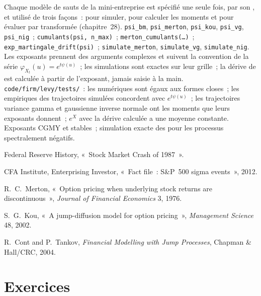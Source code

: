 \begin{build}
 Chaque modèle de sauts de la mini-entreprise est spécifié une seule fois, par son , et utilisé de trois façons~: pour simuler, pour calculer les moments et pour évaluer par
transformée (chapitre~28).
 \texttt{psi\_bm}, \texttt{psi\_merton}, \texttt{psi\_kou}, \texttt{psi\_vg},
\texttt{psi\_nig}~; \texttt{cumulants(psi, n\_max)}~; \texttt{merton\_cumulants(\dots)}~;
\texttt{exp\_martingale\_drift(psi)}~; \texttt{simulate\_merton}, \texttt{simulate\_vg},
\texttt{simulate\_nig}.
 Les exposants prennent des arguments complexes et suivent la convention de la série $\varphi_{X_t}(u) =
e^{t\psi(u)}$~; les simulations sont exactes sur leur grille~; la dérive de  est calculée à partir de l'exposant,
jamais saisie à la main.
 \texttt{code/firm/levy/tests/}~: les  numériques sont égaux aux formes closes~;
les  empiriques des trajectoires simulées concordent avec $e^{t\psi(u)}$~; les trajectoires
variance gamma et gaussienne inverse normale ont les moments que leurs exposants donnent~; $e^X$ avec la dérive
calculée a une moyenne constante.
 Exposants CGMY et stables~; simulation exacte des  pour les
processus spectralement négatifs.
\end{build}

\begin{omsources}
\item Federal Reserve History, «~Stock Market Crash of 1987~».
\item CFA Institute, Enterprising Investor, «~Fact file~: S\&P~500 sigma events~», 2012.
\item R.~C.~Merton, «~Option pricing when underlying stock returns are discontinuous~»,
\emph{Journal of Financial Economics} 3, 1976.
\item S.~G.~Kou, «~A jump-diffusion model for option pricing~», \emph{Management Science} 48, 2002.
\item R.~Cont and P.~Tankov, \emph{Financial Modelling with Jump Processes}, Chapman \& Hall/CRC, 2004.
\end{omsources}

\section{Exercices}

